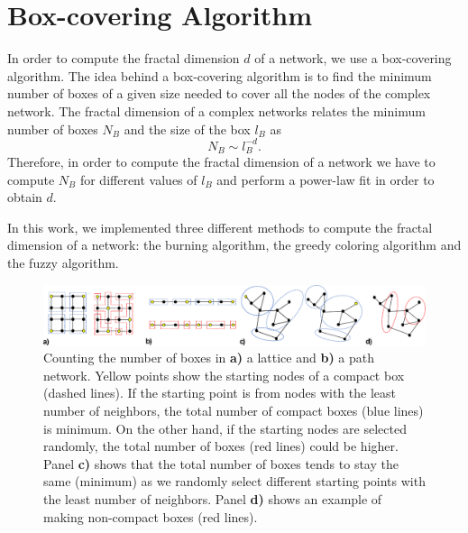 \documentclass[9pt,onecolumn,twoside]{pnas-new}
\begin{document}
\section*{Box-covering Algorithm}
In order to compute the fractal dimension $d$ of a network, we use a box-covering algorithm. The idea behind a  box-covering algorithm is to find the minimum number of boxes of a given size needed to cover all the nodes of the complex network. 
The fractal dimension of a complex networks relates the minimum number of boxes $N_B$ and the size of the box $l_B$ as
\begin{equation}
    N_B\sim l_B^{-d}.
    \label{eq:fractal}
\end{equation}
Therefore, in order to compute the fractal dimension of a network we have to compute $N_B$  for different values of $l_B$ and perform a power-law fit in order to obtain $d$.  

In this work, we implemented three different methods to compute the fractal dimension of a network: the burning algorithm, the greedy coloring algorithm and the fuzzy algorithm. 

\begin{figure}
    \centering
    \includegraphics[width=1.\columnwidth]{images/starting_node.pdf}
    \caption{Counting the number of boxes in \textbf{a)} a lattice and \textbf{b)} a path network. Yellow points show the starting nodes of a compact box (dashed lines). If the starting point is from nodes with the least number of neighbors, the total number of compact boxes (blue lines) is minimum. On the other hand, if the starting nodes are selected randomly, the total number of boxes (red lines) could be higher. Panel \textbf{c)} shows that the total number of boxes tends to stay the same (minimum) as we randomly select different starting points with the least number of neighbors. Panel \textbf{d)} shows an example of making non-compact boxes (red lines).}
    \label{fig:starting_node}
\end{figure}
\end{document}
